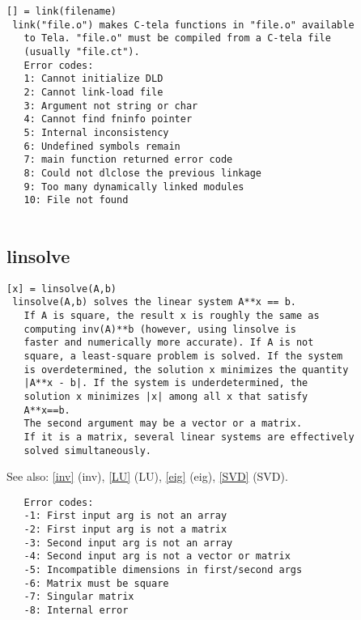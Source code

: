 \documentclass[a4paper]{article}
\begin{document}
\begin{tscreen}
\begin{verbatim}
[] = link(filename)
 link("file.o") makes C-tela functions in "file.o" available
   to Tela. "file.o" must be compiled from a C-tela file
   (usually "file.ct").
   Error codes:
   1: Cannot initialize DLD
   2: Cannot link-load file
   3: Argument not string or char
   4: Cannot find fninfo pointer
   5: Internal inconsistency
   6: Undefined symbols remain
   7: main function returned error code
   8: Could not dlclose the previous linkage
   9: Too many dynamically linked modules
   10: File not found
   
\end{verbatim}
\end{tscreen}





\subsection{linsolve\label{linsolve}}

\begin{tscreen}
\begin{verbatim}
[x] = linsolve(A,b)
 linsolve(A,b) solves the linear system A**x == b.
   If A is square, the result x is roughly the same as
   computing inv(A)**b (however, using linsolve is
   faster and numerically more accurate). If A is not
   square, a least-square problem is solved. If the system
   is overdetermined, the solution x minimizes the quantity
   |A**x - b|. If the system is underdetermined, the
   solution x minimizes |x| among all x that satisfy
   A**x==b.
   The second argument may be a vector or a matrix.
   If it is a matrix, several linear systems are effectively
   solved simultaneously.
\end{verbatim}

See also: \ref{inv} {(inv)}, \ref{LU} {(LU)}, \ref{eig} {(eig)}, \ref{SVD} {(SVD)}.
\begin{verbatim}
   Error codes:
   -1: First input arg is not an array
   -2: First input arg is not a matrix
   -3: Second input arg is not an array
   -4: Second input arg is not a vector or matrix
   -5: Incompatible dimensions in first/second args
   -6: Matrix must be square
   -7: Singular matrix
   -8: Internal error
   
\end{verbatim}
\end{tscreen}
\end{document}
